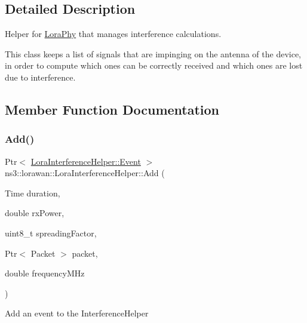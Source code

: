 \subsection{Detailed Description}
Helper for \hyperlink{classns3_1_1lorawan_1_1LoraPhy}{Lora\+Phy} that manages interference calculations.

This class keeps a list of signals that are impinging on the antenna of the device, in order to compute which ones can be correctly received and which ones are lost due to interference. 

\subsection{Member Function Documentation}
\mbox{\label{classns3_1_1lorawan_1_1LoraInterferenceHelper_a17aef550d964edfff569c8ac5940a831}} 
\subsubsection{\texorpdfstring{Add()}{Add()}}
{\footnotesize\ttfamily Ptr$<$ \hyperlink{classns3_1_1lorawan_1_1LoraInterferenceHelper_1_1Event}{Lora\+Interference\+Helper\+::\+Event} $>$ ns3\+::lorawan\+::\+Lora\+Interference\+Helper\+::\+Add (\begin{DoxyParamCaption}\item[{Time}]{duration,  }\item[{double}]{rx\+Power,  }\item[{uint8\+\_\+t}]{spreading\+Factor,  }\item[{Ptr$<$ Packet $>$}]{packet,  }\item[{double}]{frequency\+M\+Hz }\end{DoxyParamCaption})}

Add an event to the Interference\+Helper



